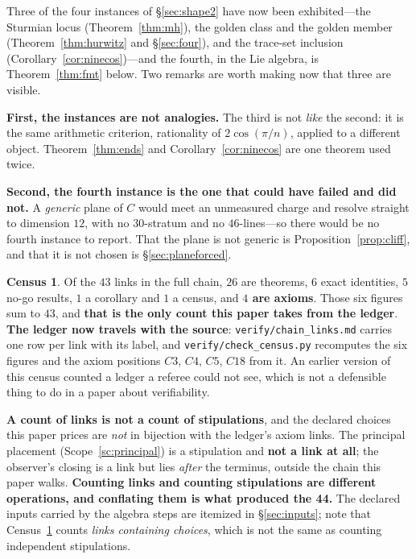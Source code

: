 \documentclass[11pt,reqno]{amsart}
\theoremstyle{plain}
\theoremstyle{definition}
\newtheorem{census}[theorem]{Census}
\theoremstyle{remark}
\newcommand{\fn}[1]{\texttt{\small #1}}
\begin{document}
Three of the four instances of \S\ref{sec:shape2} have now been exhibited---the Sturmian
locus (Theorem~\ref{thm:mh}), the golden class and the golden member
(Theorem~\ref{thm:hurwitz} and \S\ref{sec:four}), and the trace-set inclusion
(Corollary~\ref{cor:ninecos})---and the fourth, in the Lie algebra, is
Theorem~\ref{thm:fmt} below. Two remarks are worth making now that three are visible.

\textbf{First, the instances are not analogies.} The third is not \emph{like} the second:
it is the same arithmetic criterion, rationality of $2\cos(\pi/n)$, applied to a
different object. Theorem~\ref{thm:ends} and Corollary~\ref{cor:ninecos} are one theorem
used twice.

\textbf{Second, the fourth instance is the one that could have failed and did not.} A
\emph{generic} plane of $C$ would meet an unmeasured charge and resolve straight to
dimension $12$, with no $30$-stratum and no $46$-lines---so there would be no fourth
instance to report. That the plane is not generic is Proposition~\ref{prop:cliff}, and
that it is not chosen is \S\ref{sec:planeforced}.

\begin{census}\label{cen:forced}
Of the $43$ links in the full chain, $26$ are theorems, $6$ exact identities, $5$ no-go
results, $1$ a corollary and $1$ a census, and \textbf{$4$ are axioms}. Those six figures
sum to $43$, and \textbf{that is the only count this paper takes from the ledger}.
\textbf{The ledger now travels with the source}: \fn{verify/chain\_\allowbreak links.md}
carries one row per link with its label, and \fn{verify/check\_\allowbreak census.py}
recomputes the six figures and the axiom positions $C3$, $C4$, $C5$, $C18$ from it. An
earlier version of this census counted a ledger a referee could not see, which is not a
defensible thing to do in a paper about verifiability.

\textbf{A count of links is not a count of stipulations}, and the declared choices this paper prices are \emph{not} in bijection with the ledger's
axiom links. The principal placement (Scope~\ref{sc:principal}) is a stipulation and
\textbf{not a link at all}; the observer's closing is a link but lies \emph{after} the
terminus, outside the chain this paper walks. \textbf{Counting links and counting
stipulations are different operations, and conflating them is what produced the
44.}
The declared inputs carried by the algebra steps are itemized in \S\ref{sec:inputs};
note that Census~\ref{cen:forced} counts \emph{links containing choices}, which is not
the same as counting independent stipulations.
\end{census}
\end{document}
